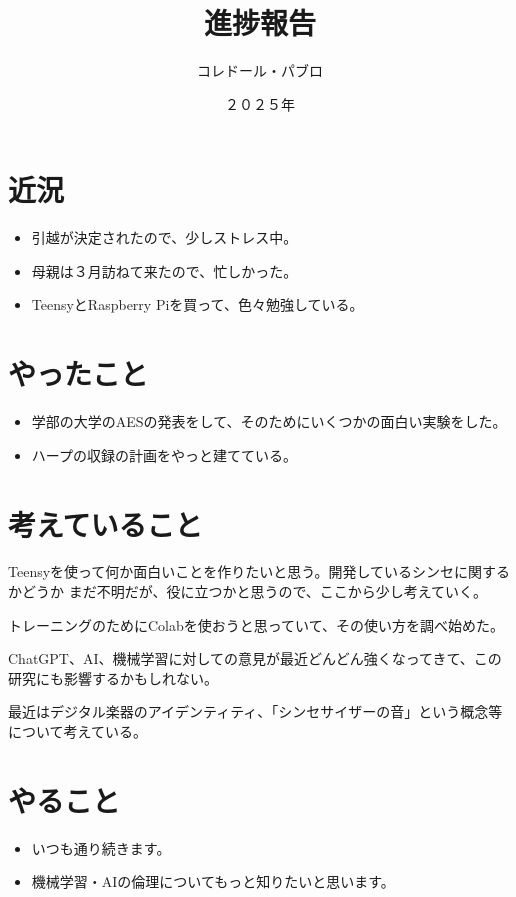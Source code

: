 \documentclass[a4paper, 12pt]{article}
\title{進捗報告}
\author{コレドール・パブロ}
\date{２０２５年}
\begin{document}
\maketitle

\section*{近況}
\begin{itemize}
    \item 引越が決定されたので、少しストレス中。
    \item 母親は３月訪ねて来たので、忙しかった。
    \item TeensyとRaspberry Piを買って、色々勉強している。
\end{itemize} 

\section*{やったこと}
\begin{itemize}
    \item 学部の大学のAESの発表をして、そのためにいくつかの面白い実験をした。
    \item ハープの収録の計画をやっと建てている。
\end{itemize}

\section*{考えていること}

Teensyを使って何か面白いことを作りたいと思う。開発しているシンセに関するかどうか
まだ不明だが、役に立つかと思うので、ここから少し考えていく。

トレーニングのためにColabを使おうと思っていて、その使い方を調べ始めた。

ChatGPT、AI、機械学習に対しての意見が最近どんどん強くなってきて、この研究にも影響するかもしれない。

最近はデジタル楽器のアイデンティティ、「シンセサイザーの音」という概念等について考えている。

\section*{やること}
\begin{itemize}
    \item いつも通り続きます。
    \item 機械学習・AIの倫理についてもっと知りたいと思います。
\end{itemize}

\end{document}
